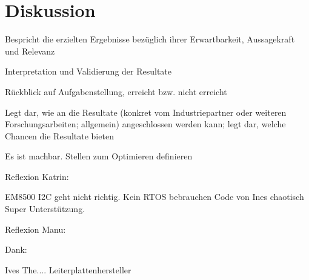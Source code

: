 \chapter{Diskussion}

Bespricht die erzielten Ergebnisse bezüglich ihrer Erwartbarkeit, Aussagekraft und Relevanz

Interpretation und Validierung der Resultate

Rückblick auf Aufgabenstellung, erreicht bzw. nicht erreicht

Legt dar, wie an die Resultate (konkret vom Industriepartner oder weiteren
Forschungsarbeiten; allgemein) angeschlossen werden kann; legt dar, welche Chancen die
Resultate bieten


Es ist machbar.
Stellen zum Optimieren definieren


Reflexion Katrin:

EM8500 I2C geht nicht richtig.
Kein RTOS bebrauchen
Code von Ines chaotisch
Super Unterstützung.

Reflexion Manu:





Dank:

Ives The.... 
Leiterplattenhersteller



